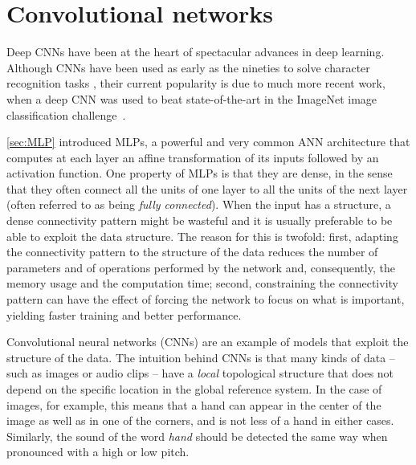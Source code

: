 \section{Convolutional networks}\label{sec:cnn}

Deep CNNs have been at the heart of spectacular advances in deep learning.
Although CNNs have been used as early as the nineties to solve character
recognition tasks \citep{le1997reading}, their current popularity is due to
much more recent work, when a deep CNN was used to beat state-of-the-art in the
ImageNet image classification challenge~\citep{krizhevsky2012imagenet}.

%
\autoref{sec:MLP} introduced MLPs, a powerful and very common ANN architecture
that computes at each layer an affine transformation of its inputs followed by
an activation function. One property of MLPs is that they are dense, in the
sense that they often connect all the units of one layer to all the units of
the next layer (often referred to as being \emph{fully connected}). When the
input has a structure, a dense connectivity pattern might be wasteful and it is
usually preferable to be able to exploit the data structure. The reason for
this is twofold: first, adapting the connectivity pattern to the structure of
the data reduces the number of parameters and of operations performed by the
network and, consequently, the memory usage and the computation time; second,
constraining the connectivity pattern can have the effect of forcing the
network to focus on what is important, yielding faster training and better
performance.

Convolutional neural networks (CNNs) are an example of models that exploit
the structure of the data. The intuition behind CNNs is that many kinds of data
-- such as images or audio clips -- have a \emph{local} topological structure
that does not depend on the specific location in the global reference system.
In the case of images, for example, this means that a hand can appear in the
center of the image as well as in one of the corners, and is not less of a hand
in either cases. Similarly, the sound of the word \emph{hand} should be
detected the same way when pronounced with a high or low pitch.

